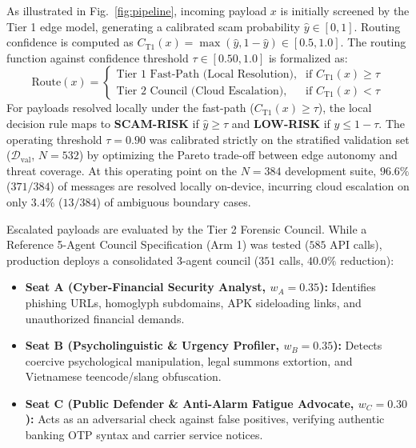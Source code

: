 \documentclass[journal]{IEEEtran}
\begin{document}
As illustrated in Fig.~\ref{fig:pipeline}, incoming payload $x$ is initially screened by the Tier 1 edge model, generating a calibrated scam probability $\hat{y} \in [0, 1]$. Routing confidence is computed as $C_{\text{T1}}(x) = \max(\hat{y}, 1 - \hat{y}) \in [0.5, 1.0]$. The routing function against confidence threshold $\tau \in [0.50, 1.0]$ is formalized as:
\begin{equation}
\label{eq:routing}
\text{Route}(x) = \begin{cases}
\text{Tier 1 Fast-Path (Local Resolution)}, & \text{if } C_{\text{T1}}(x) \ge \tau \\
\text{Tier 2 Council (Cloud Escalation)}, & \text{if } C_{\text{T1}}(x) < \tau
\end{cases}
\end{equation}
For payloads resolved locally under the fast-path ($C_{\text{T1}}(x) \ge \tau$), the local decision rule maps to \textbf{SCAM-RISK} if $\hat{y} \ge \tau$ and \textbf{LOW-RISK} if $\hat{y} \le 1 - \tau$. The operating threshold $\tau = 0.90$ was calibrated strictly on the stratified validation set ($\mathcal{D}_{\text{val}}$, $N=532$) by optimizing the Pareto trade-off between edge autonomy and threat coverage. At this operating point on the $N=384$ development suite, $96.6\%$ ($371/384$) of messages are resolved locally on-device, incurring cloud escalation on only $3.4\%$ ($13/384$) of ambiguous boundary cases.

Escalated payloads are evaluated by the Tier 2 Forensic Council. While a Reference 5-Agent Council Specification (Arm 1) was tested ($585$ API calls), production deploys a consolidated 3-agent council ($351$ calls, $40.0\%$ reduction):
\begin{itemize}
    \item \textbf{Seat A (Cyber-Financial Security Analyst, $w_A = 0.35$):} Identifies phishing URLs, homoglyph subdomains, APK sideloading links, and unauthorized financial demands.
    \item \textbf{Seat B (Psycholinguistic \& Urgency Profiler, $w_B = 0.35$):} Detects coercive psychological manipulation, legal summons extortion, and Vietnamese teencode/slang obfuscation.
    \item \textbf{Seat C (Public Defender \& Anti-Alarm Fatigue Advocate, $w_C = 0.30$):} Acts as an adversarial check against false positives, verifying authentic banking OTP syntax and carrier service notices.
\end{itemize}
\end{document}
